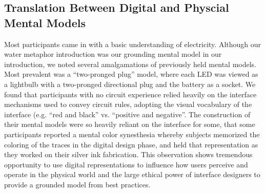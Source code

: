\documentclass{sigchi}
\begin{document}
  \subsection{Translation Between Digital and Physcial Mental Models}
  Most participants came in with a basic understanding of electricity. Although our water metaphor introduction was our grounding mental model in our introduction, we noted several amalgamations of previously held mental models. Most prevalent was a ``two-pronged plug'' model, where each LED was viewed as a lightbulb with a two-pronged directional plug and the battery as a socket. We found that participants with no circuit experience relied heavily on the interface mechanisms used to convey circuit rules, adopting the visual vocabulary of the interface (e.g. ``red and black'' vs. ``positive and negative''. The construction of their mental models were so heavily reliant on the interface for some, that some participants reported a mental color synesthesia whereby subjects memorized the coloring of the traces in the digital design phase, and held that representation as they worked on their silver ink fabrication. This observation shows tremendous opportunity to use digital representations to influence how users perceive and operate in the physical world and the large ethical power of interface designers to provide a grounded model from best practices. 
\end{document}
